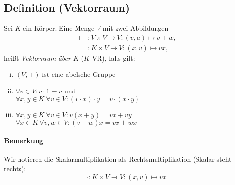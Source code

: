 
\subsection{Definition (Vektorraum)}
	\begin{Definition}[Vektorraum]
		Sei $K$ ein Körper. Eine Menge $V$ mit zwei Abbildungen
	\begin{align*}
		 +&: V \times V \to V:(v,u)\mapsto v+w,\\
		 \cdot &: K \times V \to V:(x,v)\mapsto vx,
	\end{align*}
	heißt \emph{Vektorraum über $K$} ($K$-VR), falls gilt:
	\begin{enumerate}[(i)]
		\item $(V,+)$ ist eine abelsche Gruppe
		\item $\forall v\in V: v\cdot 1=v$ und\\
                      $\forall x,y \in K\ \forall v\in V: (v\cdot x)\cdot y = v\cdot (x\cdot y)$
		\item $\forall x,y \in K\ \forall v\in V: v(x+y) = vx + vy$\\
                      $\forall x\in K\ \forall v,w\in V: (v+w)x = vx + wx$
	\end{enumerate}
	\end{Definition}

\paragraph{Bemerkung}
	Wir notieren die Skalarmultiplikation als Rechtsmultiplikation (Skalar steht rechts):
		\[ \cdot: K \times V \to V : (x,v) \mapsto vx \]


